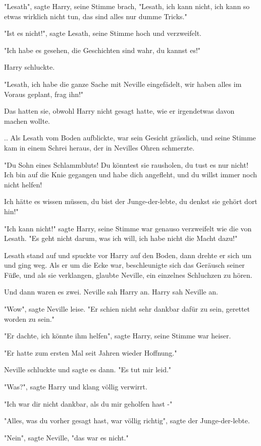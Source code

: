 {"Lesath", sagte Harry, seine Stimme brach, "Lesath, ich kann nicht, ich kann so etwas wirklich nicht tun, das sind alles nur dumme Tricks."

"Ist es nicht!", sagte Lesath, seine Stimme hoch und verzweifelt.

"Ich habe es gesehen, die Geschichten sind wahr, du kannst es!"

Harry schluckte.

"Lesath, ich habe die ganze Sache mit Neville eingefädelt, wir haben alles im Voraus geplant, frag ihn!"

Das hatten sie, obwohl Harry nicht gesagt hatte, wie er irgendetwas davon machen wollte.

.. Als Lesath vom Boden aufblickte, war sein Gesicht grässlich, und seine Stimme kam in einem Schrei heraus, der in Nevilles Ohren schmerzte.

"Du Sohn eines Schlammbluts! Du könntest sie rausholen, du tust es nur nicht! Ich bin auf die Knie gegangen und habe dich angefleht, und du willst immer noch nicht helfen!

Ich hätte es wissen müssen, du bist der Junge-der-lebte, du denkst sie gehört dort hin!"

"Ich kann nicht!" sagte Harry, seine Stimme war genauso verzweifelt wie die von Lesath. "Es geht nicht darum, was ich will, ich habe nicht die Macht dazu!"

Lesath stand auf und spuckte vor Harry auf den Boden, dann drehte er sich um und ging weg. Als er um die Ecke war, beschleunigte sich das Geräusch seiner Füße, und als sie verklangen, glaubte Neville, ein einzelnes Schluchzen zu hören.

Und dann waren es zwei. Neville sah Harry an. Harry sah Neville an.

"Wow", sagte Neville leise. "Er schien nicht sehr dankbar dafür zu sein, gerettet worden zu sein."

"Er dachte, ich könnte ihm helfen", sagte Harry, seine Stimme war heiser.

"Er hatte zum ersten Mal seit Jahren wieder Hoffnung."

Neville schluckte und sagte es dann. "Es tut mir leid."

"Was?", sagte Harry und klang völlig verwirrt.

"Ich war dir nicht dankbar, als du mir geholfen hast -"

"Alles, was du vorher gesagt hast, war völlig richtig", sagte der Junge-der-lebte.

"Nein", sagte Neville, "das war es nicht."

}
